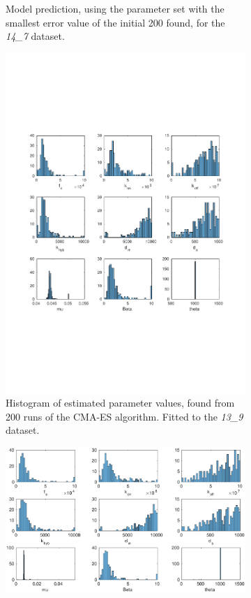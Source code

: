 \documentclass[10pt,journal]{./IEEE_latex_class/IEEEtran}
\begin{document}
\begin{figure}
\begin{subfigure}[c]{0.49\textwidth}
        \caption{Model prediction, using the parameter set with the smallest error value of the initial 200 found, for the \textit{14\_7} dataset.}
        \label{InitialResults_14_7_best}
    \end{subfigure}
        \begin{subfigure}[h]{0.49\textwidth}
    \centering
        \includegraphics[scale = 0.24, clip = true, trim = 130 0 125 0]{13_9_hist}
        \caption{Histogram of estimated parameter values, found from 200 runs of the CMA-ES algorithm. Fitted to the \textit{13\_9} dataset.}
        \label{InitialResults_13_9_hist}
    \end{subfigure}
    \begin{subfigure}[c]{0.49\textwidth}
    \centering
        \includegraphics[scale = 0.24,clip = true, trim = 130 0 125 0]{14_7_hist}

\end{subfigure}
\end{figure}
\end{document}
